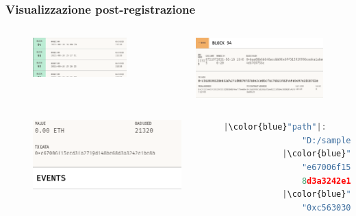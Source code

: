 \documentclass{beamer}
\begin{document}
\begin{frame}[fragile]
	\frametitle{Visualizzazione post-registrazione}
	\begin{columns}
		\begin{figure}
			\includegraphics[width=\textwidth]{figures/blocks.png}
		\end{figure}
		\begin{figure}
			\includegraphics[width=\textwidth]{figures/block.png}
		\end{figure}
	\end{columns}
	\begin{columns}
		\column{0.5\textwidth}
		\begin{figure}
			\includegraphics[width=\textwidth]{figures/block2.png}
		\end{figure}
		\bigskip
		\column{0.5\textwidth}
		\begin{lstlisting}[language=JavaScript, numbers=none]
			|\color{blue}"path"|:
				"D:/sample",
			|\color{blue}"root"|:
				"e67006f15ecd3[...]e6
				8d3a3242e1be8b",
			|\color{blue}"transHash"|:
				"0xc563030328e[...]69eb497e2dc87d2e"
		\end{lstlisting}
	\end{columns}
\end{frame}
\end{document}
